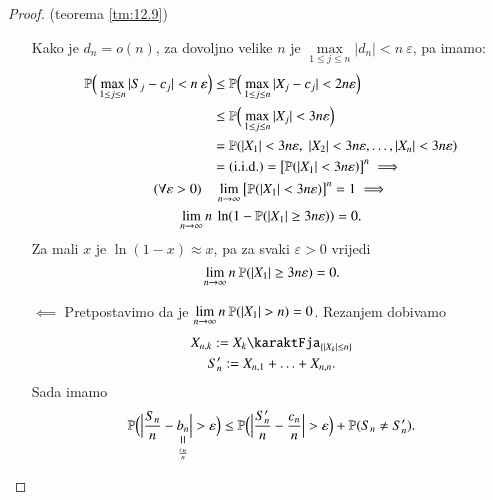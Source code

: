 \begin{proof}{(teorema \ref{tm:12.9})}
\begin{itemize}
\begin{equation*}
        \end{equation*}
        Kako je $d_n = o(n)$, za dovoljno velike $n$ je $\max\limits_{1 \leq j \leq n} |d_n| < n \: \varepsilon$, pa imamo:
        \begin{equation*}
            \begin{gathered}
                \begin{aligned}
                    \mathbb{P} \Big( \max\limits_{1 \leq j \leq n}  |S_j - c_j| < n \: \varepsilon \Big) &\leq \mathbb{P} \Big( \max\limits_{1 \leq j \leq n} |X_j - c_j| < 2 n \varepsilon \Big)\\
                    &\leq \mathbb{P} \Big( \max\limits_{1 \leq j \leq n} |X_j| < 3 n \varepsilon \Big)\\
                    &= \mathbb{P}({|X_1| < 3 n \varepsilon, \; |X_2| < 3 n \varepsilon, \ldots, |X_n| < 3 n \varepsilon})\\
                    &= (\mathrm{i.i.d.}) = \big[ \mathbb{P}({|X_1| < 3 n \varepsilon}) \big]^n \implies                    
                \end{aligned}\\
                    (\forall \varepsilon > 0) \quad \lim\limits_{n \to \infty} \big[ \mathbb{P}({|X_1| < 3 n \varepsilon}) \big]^n = 1 \implies\\
                    \lim\limits_{n \to \infty} n \: \ln ( 1 - \mathbb{P}({|X_1| \geq 3 n \varepsilon}) ) = 0.
            \end{gathered}
        \end{equation*}
        Za mali $x$ je $\ln (1 - x) \approx x$, pa za svaki $\varepsilon > 0$ vrijedi
        \begin{equation*}
            \lim\limits_{n \to \infty} n \: \mathbb{P}({|X_1| \geq 3 n \varepsilon}) = 0.
        \end{equation*}
        \item[$\impliedby$] Pretpostavimo da je $\lim\limits_{n \to \infty} n \: \mathbb{P}({|X_1| > n}) = 0$.
        Rezanjem dobivamo
        \begin{equation*}
            \begin{gathered}
                X_{n, k} := X_k \karaktFja_{\{ |X_k| \leq n \}}\\
                S_n' := X_{n, 1} + \ldots + X_{n, n}.
            \end{gathered}
        \end{equation*}
        Sada imamo
        \begin{equation*}
            \masP \Big( \Big| \frac{S_n}{n} - \equalto{b_n}{\frac{c_n}{n}} \Big| > \varepsilon \Big) \leq \masP \Big( \Big| \frac{S_n'}{n} - \frac{c_n}{n} \Big| > \varepsilon \Big) + \vjeroj{S_n \neq S_n'}.

\end{equation*}
\end{itemize}
\end{proof}
